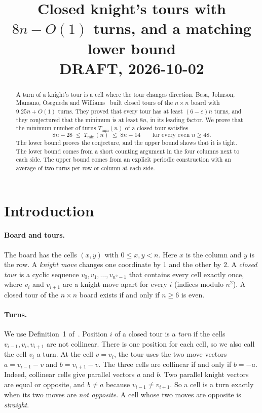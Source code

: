\documentclass[11pt]{article}
\title{Closed knight's tours with $8n-O(1)$ turns, and a matching lower bound\\[4pt]
\large DRAFT, 2026-10-02}
\author{\todo{author list}}
\date{}
\theoremstyle{definition}
\theoremstyle{remark}
\newcommand{\Tmin}{T_{\min}}
\begin{document}
\maketitle

\begin{abstract}
A turn of a knight's tour is a cell where the tour changes direction.
Besa, Johnson, Mamano, Osegueda and Williams~\cite{bjmow} built closed tours of the $n\times n$ board with $9.25n+O(1)$ turns.
They proved that every tour has at least $(6-\varepsilon)n$ turns, and they conjectured that the minimum is at least $8n$, in its leading factor.
We prove that the minimum number of turns $\Tmin(n)$ of a closed tour satisfies
\[ 8n-28 \;\le\; \Tmin(n) \;\le\; 8n-14 \qquad\text{for every even } n\ge 48. \]
The lower bound proves the conjecture, and the upper bound shows that it is tight.
The lower bound comes from a short counting argument in the four columns next to each side.
The upper bound comes from an explicit periodic construction with an average of two turns per row or column at each side.
\end{abstract}

\section{Introduction}

\paragraph{Board and tours.}
The board has the cells $(x,y)$ with $0\le x,y<n$.
Here $x$ is the column and $y$ is the row.
A \emph{knight move} changes one coordinate by $1$ and the other by $2$.
A \emph{closed tour} is a cyclic sequence $v_0,v_1,\dots,v_{n^2-1}$ that contains every cell exactly once, where $v_i$ and $v_{i+1}$ are a knight move apart for every $i$ (indices modulo $n^2$).
A closed tour of the $n\times n$ board exists if and only if $n\ge 6$ is even.

\paragraph{Turns.}
We use Definition~1 of~\cite{bjmow}.
Position $i$ of a closed tour is a \emph{turn} if the cells $v_{i-1},v_i,v_{i+1}$ are not collinear.
There is one position for each cell, so we also call the cell $v_i$ a turn.
At the cell $v=v_i$, the tour uses the two move vectors $a=v_{i-1}-v$ and $b=v_{i+1}-v$.
The three cells are collinear if and only if $b=-a$.
Indeed, collinear cells give parallel vectors $a$ and $b$.
Two parallel knight vectors are equal or opposite, and $b\ne a$ because $v_{i-1}\ne v_{i+1}$.
So a cell is a turn exactly when its two moves are \emph{not opposite}.
A cell whose two moves are opposite is \emph{straight}.
\end{document}
